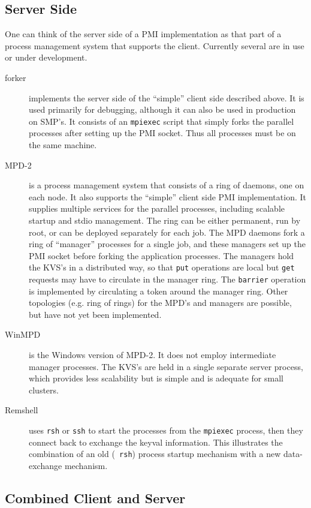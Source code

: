 \documentclass[11pt]{article}
\begin{document}
\subsection{Server Side}
\label{sec:server-side}

One can think of the server side of a PMI implementation as that part of
a process management system that supports the client.  Currently several
are in use or under development.

\begin{description}
\item[forker] implements the server side of the ``simple'' client side
  described above.  It is used primarily for debugging, although it can
  also be used in production on SMP's.  It consists of an {\tt mpiexec}
  script that simply forks the parallel processes after setting up the
  PMI socket.  Thus all processes must be on the same machine.
\item[MPD-2] is a process management system that consists of a ring of
  daemons, one on each node.  It also supports the ``simple'' client
  side PMI implementation.  It supplies multiple services for the
  parallel processes, including scalable startup and stdio management.
  The ring can be either permanent, run by root, or can be deployed
  separately for each job.  The MPD daemons fork a ring of ``manager''
  processes for a single job, and these managers set up the PMI socket
  before forking the application processes.  The managers hold the KVS's
  in a distributed way, so that {\tt put} operations are local but {\tt get}
  requests may have to circulate in the manager ring.  The {\tt barrier}
  operation is implemented by circulating a token around the manager
  ring.  Other topologies (e.g. ring of rings) for the MPD's and
  managers are possible, but have not yet been implemented.
\item[WinMPD] is the Windows version of MPD-2.  It does not employ
  intermediate manager processes.  The KVS's are held in a single
  separate server process, which provides less scalability but is
  simple and is adequate for small clusters.
\item[Remshell] uses {\tt rsh} or {\tt ssh} to start the processes from
  the {\tt mpiexec} process, then they connect back to exchange the
  keyval information.  This illustrates the combination of an old ({\tt
    rsh}) process startup mechanism with a new data-exchange mechanism.
\end{description}

\subsection{Combined Client and Server}
\label{sec:combined}
\end{document}
